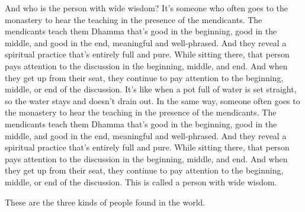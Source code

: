 \documentclass[12pt,openany]{book}%
\begin{document}
And who is the person with wide wisdom? It’s someone who often goes to the monastery to hear the teaching in the presence of the mendicants. The mendicants teach them Dhamma that’s good in the beginning, good in the middle, and good in the end, meaningful and well-phrased. And they reveal a spiritual practice that’s entirely full and pure. While sitting there, that person pays attention to the discussion in the beginning, middle, and end. And when they get up from their seat, they continue to pay attention to the beginning, middle, or end of the discussion. It’s like when a pot full of water is set straight, so the water stays and doesn’t drain out. In the same way, someone often goes to the monastery to hear the teaching in the presence of the mendicants. The mendicants teach them Dhamma that’s good in the beginning, good in the middle, and good in the end, meaningful and well-phrased. And they reveal a spiritual practice that’s entirely full and pure. While sitting there, that person pays attention to the discussion in the beginning, middle, and end. And when they get up from their seat, they continue to pay attention to the beginning, middle, or end of the discussion. This is called a person with wide wisdom. 

These are the three kinds of people found in the world. 
\end{document}

